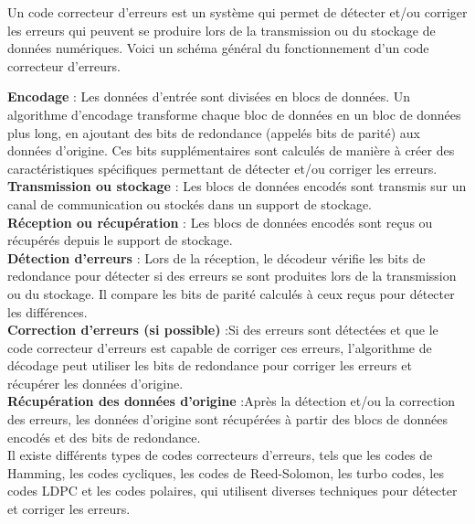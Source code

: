 \documentclass[12pt,openany]{report}
\begin{document}
Un code correcteur d'erreurs est un système qui permet de détecter et/ou corriger les erreurs qui peuvent se produire lors de la transmission ou du stockage de données numériques.\hspace{0.2cm} Voici un schéma général du fonctionnement d'un code correcteur d'erreurs.
\begin{flushleft}



\textbf{ Encodage} : Les données d'entrée sont divisées en blocs de données.\hspace{0.2cm}
Un algorithme d'encodage transforme chaque bloc de données en un bloc de données plus long,\hspace{0.2cm} en ajoutant des bits de redondance (appelés bits de parité) aux données d'origine.\hspace{0.2cm} Ces bits supplémentaires sont calculés de manière à créer des caractéristiques spécifiques permettant de détecter et/ou corriger les erreurs.\\
 \textbf{ Transmission ou stockage} : Les blocs de données encodés sont transmis sur un canal de communication ou stockés dans un support de stockage.\\
\textbf{ Réception ou récupération} : Les blocs de données encodés sont reçus ou récupérés depuis le support de stockage.\\
\textbf{  Détection d'erreurs} : Lors de la réception,\hspace{0.2cm} le décodeur vérifie les bits de redondance pour détecter si des erreurs se sont produites lors de la transmission ou du stockage.\hspace{0.2cm} Il compare les bits de parité calculés à ceux reçus pour détecter les différences.\\
 \textbf{ Correction d'erreurs (si possible) }:\hspace{0.2cm}Si des erreurs sont détectées et que le code correcteur d'erreurs est capable de corriger ces erreurs,\hspace{0.2cm} l'algorithme de décodage peut utiliser les bits de redondance pour corriger les erreurs et récupérer les données d'origine.\\
\textbf{ Récupération des données d'origine }:Après la détection et/ou la correction des erreurs, \hspace{0.2cm}les données d'origine sont récupérées à partir des blocs de données encodés et des bits de redondance.\\
Il existe différents types de codes correcteurs d'erreurs, \hspace{0.2cm}tels que les codes de Hamming,\hspace{0.2cm} les codes cycliques, les codes de Reed-Solomon,\hspace{0.2cm} les turbo codes, les codes LDPC et les codes polaires,\hspace{0.2cm} qui utilisent diverses techniques pour détecter et corriger les erreurs.

\end{flushleft}
\end{document}
